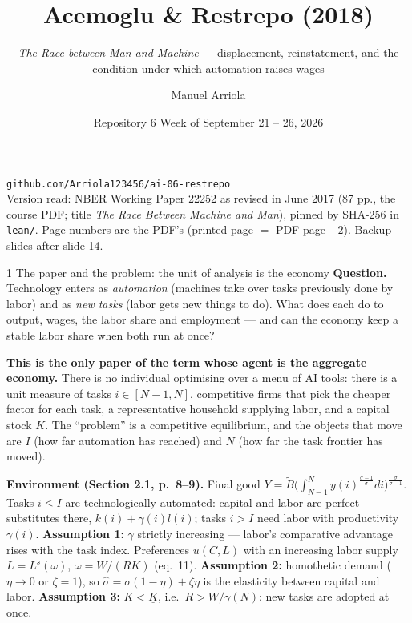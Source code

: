\documentclass[aspectratio=169,11pt]{beamer}
\title{Acemoglu \& Restrepo (2018)}
\subtitle{\emph{The Race between Man and Machine} --- displacement, reinstatement, and the condition under which automation raises wages}
\author{Manuel Arriola}
\date{Repository 6 \textperiodcentered{} Week of September 21 -- 26, 2026}
\begin{document}
\begin{frame}[plain]
  \titlepage
  \begin{center}\small
    \texttt{github.com/Arriola123456/ai-06-restrepo}\\[2pt]
    \footnotesize Version read: NBER Working Paper 22252 as revised in June 2017 (87 pp., the course PDF; title
    \emph{The Race Between Machine and Man}), pinned by SHA-256 in \texttt{lean/}. Page numbers are the PDF's
    (printed page $=$ PDF page $-2$). Backup slides after slide 14.
  \end{center}
\end{frame}

\begin{frame}{1 \textperiodcentered{} The paper and the problem: the unit of analysis is the economy}
  \footnotesize
  \textbf{Question.} Technology enters as \emph{automation} (machines take over tasks previously done by
  labor) and as \emph{new tasks} (labor gets new things to do). What does each do to output, wages, the labor
  share and employment --- and can the economy keep a stable labor share when both run at once?

  \smallskip
  \textbf{This is the only paper of the term whose agent is the aggregate economy.} There is no individual
  optimising over a menu of AI tools: there is a unit measure of tasks $i\in[N-1,N]$, competitive firms that
  pick the cheaper factor for each task, a representative household supplying labor, and a capital stock $K$.
  The ``problem'' is a competitive equilibrium, and the objects that move are $I$ (how far automation has
  reached) and $N$ (how far the task frontier has moved).

  \smallskip
  \textbf{Environment (Section 2.1, p.\ 8--9).} Final good $Y=\tilde B\big(\int_{N-1}^N y(i)^{\frac{\sigma-1}{\sigma}}di\big)^{\frac{\sigma}{\sigma-1}}$.
  Tasks $i\le I$ are technologically automated: capital and labor are perfect substitutes there,
  $k(i)+\gamma(i)l(i)$; tasks $i>I$ need labor with productivity $\gamma(i)$.
  \textbf{Assumption 1:} $\gamma$ strictly increasing --- labor's comparative advantage rises with the task index.
  Preferences $u(C,L)$ with an increasing labor supply $L=L^s(\omega)$, $\omega=W/(RK)$ (eq.\ 11).
  \textbf{Assumption 2:} homothetic demand ($\eta\to0$ or $\zeta=1$), so $\hat\sigma=\sigma(1-\eta)+\zeta\eta$ is the
  elasticity between capital and labor. \textbf{Assumption 3:} $K<\underline K$, i.e.\ $R>W/\gamma(N)$: new tasks
  are adopted at once.
\end{frame}
\end{document}
